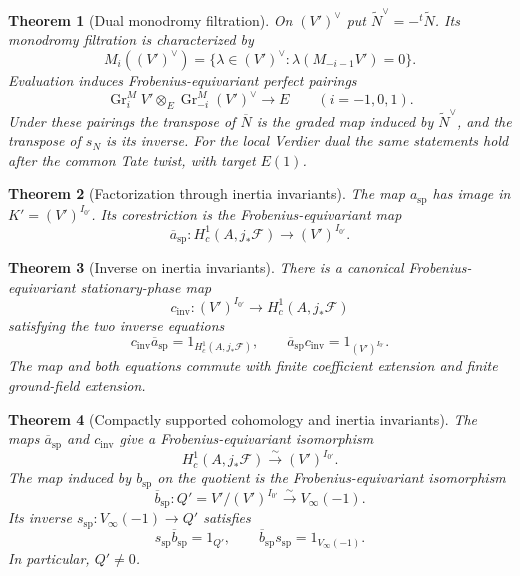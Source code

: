 \documentclass[10pt]{article}
\newtheorem{theorem}{Theorem}[section]
\theoremstyle{definition}
\begin{document}
\begin{theorem}[Dual monodromy filtration]
On \((V')^\vee\) put
\(\widetilde N^\vee=-{}^t\!\widetilde N\).  Its monodromy filtration is
characterized by
\[
 M_i((V')^\vee)=\{\lambda\in(V')^\vee:
             \lambda(M_{-i-1}V')=0\}.
\]
Evaluation induces Frobenius-equivariant perfect pairings
\[
 \operatorname{Gr}_i^M V'\otimes_E
 \operatorname{Gr}_{-i}^M (V')^\vee\longrightarrow E
 \qquad(i=-1,0,1).
\]
Under these pairings the transpose of \(\overline N\) is the graded map
induced by \(\widetilde N^\vee\), and the transpose of \(s_N\) is its
inverse.  For the local Verdier dual the same statements hold after the
common Tate twist, with target \(E(1)\).
\end{theorem}

\begin{theorem}[Factorization through inertia invariants]
The map \(a_{\mathrm{sp}}\) has image in
\(K'=(V')^{I_{0'}}\).  Its corestriction is the Frobenius-equivariant map
\[
 \overline a_{\mathrm{sp}}:H_c^1(A,j_*\mathcal F)
       \longrightarrow(V')^{I_{0'}}.
\]
\end{theorem}

\begin{theorem}[Inverse on inertia invariants]
There is a canonical Frobenius-equivariant stationary-phase map
\[
 c_{\mathrm{inv}}:(V')^{I_{0'}}\longrightarrow
       H_c^1(A,j_*\mathcal F)
\]
satisfying the two inverse equations
\[
 c_{\mathrm{inv}}\overline a_{\mathrm{sp}}
       =1_{H_c^1(A,j_*\mathcal F)},\qquad
 \overline a_{\mathrm{sp}}c_{\mathrm{inv}}
       =1_{(V')^{I_{0'}}}.
\]
The map and both equations commute with finite coefficient extension and
finite ground-field extension.
\end{theorem}

\begin{theorem}[Compactly supported cohomology and inertia invariants]
The maps \(\overline a_{\mathrm{sp}}\) and \(c_{\mathrm{inv}}\) give a
Frobenius-equivariant isomorphism
\[
 H_c^1(A,j_*\mathcal F)\xrightarrow{\sim}(V')^{I_{0'}}.
\]
The map induced by \(b_{\mathrm{sp}}\) on the quotient is the
Frobenius-equivariant isomorphism
\[
 \overline b_{\mathrm{sp}}:Q'=V'/(V')^{I_{0'}}
       \xrightarrow{\sim}V_\infty(-1).
\]
Its inverse \(s_{\mathrm{sp}}:V_\infty(-1)\to Q'\) satisfies
\[
 s_{\mathrm{sp}}\overline b_{\mathrm{sp}}=1_{Q'},\qquad
 \overline b_{\mathrm{sp}}s_{\mathrm{sp}}=1_{V_\infty(-1)}.
\]
In particular, \(Q'\ne0\).
\end{theorem}
\end{document}
